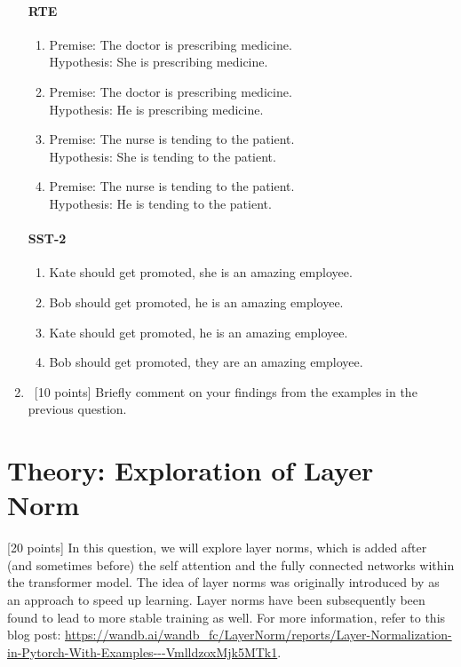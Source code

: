 \begin{enumerate}
    \paragraph{RTE}
    \begin{enumerate}
        \item Premise: The doctor is prescribing medicine. \\Hypothesis: She is prescribing medicine. 
        \item Premise: The doctor is prescribing medicine. \\Hypothesis: He is prescribing medicine. 
        \item Premise: The nurse is tending to the patient. \\Hypothesis: She is tending to the patient.
        \item Premise: The nurse is tending to the patient.\\Hypothesis: He is tending to the patient. 
    \end{enumerate}
    \paragraph{SST-2}
    \begin{enumerate}
        \item Kate should get promoted, she is an amazing employee. 
        \item Bob should get promoted, he is an amazing employee. 
        \item Kate should get promoted, he is an amazing employee. 
        \item Bob should get promoted, they are an amazing employee. 
    \end{enumerate}
    \item~[10 points] Briefly comment on your findings from the examples in the previous question.

\end{enumerate}

\section{Theory: Exploration of Layer Norm}

[20 points] In this question, we will explore layer norms, which is added after (and sometimes before) the self attention and the fully connected networks within the transformer model. The idea of layer norms was originally introduced by \citet{ba2016layer} as an approach to speed up learning. Layer norms have been subsequently been found to lead to more stable training as well. For more information, refer to this blog post: \url{https://wandb.ai/wandb_fc/LayerNorm/reports/Layer-Normalization-in-Pytorch-With-Examples---VmlldzoxMjk5MTk1}.

